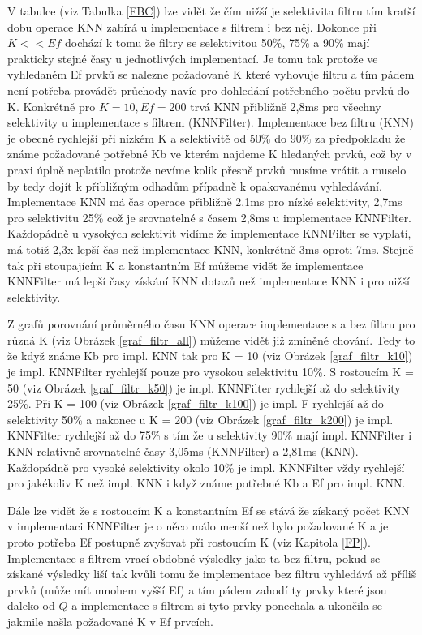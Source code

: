 \documentclass[czech,semestral,dept460,male,csharp,cpdeclaration]{diploma}
\begin{document}
		V tabulce (viz Tabulka \ref{FBC}) lze vidět že čím nižší je selektivita filtru tím kratší dobu operace KNN zabírá u implementace s filtrem i bez něj. Dokonce při $K << Ef$ dochází k tomu že filtry se selektivitou 50\%, 75\% a 90\% mají prakticky stejné časy u jednotlivých implementací. Je tomu tak protože ve vyhledaném Ef prvků se nalezne požadované K které vyhovuje filtru a tím pádem není potřeba provádět průchody navíc pro dohledání potřebného počtu prvků do K. Konkrétně pro $K = 10, Ef = 200$ trvá KNN přibližně 2,8ms pro všechny selektivity u implementace s filtrem (KNNFilter). Implementace bez filtru (KNN) je obecně rychlejší při nízkém K a selektivitě od 50\% do 90\% za předpokladu že známe požadované potřebné Kb ve kterém najdeme K hledaných prvků, což by v praxi úplně neplatilo protože nevíme kolik přesně prvků musíme vrátit a muselo by tedy dojít k přibližným odhadům případně k opakovanému vyhledávání. Implementace KNN má čas operace přibližně 2,1ms pro nízké selektivity, 2,7ms pro selektivitu 25\% což je srovnatelné s časem 2,8ms u implementace KNNFilter. Každopádně u vysokých selektivit vidíme že implementace KNNFilter se vyplatí, má totiž 2,3x lepší čas než implementace KNN, konkrétně 3ms oproti 7ms. Stejně tak při stoupajícím K a konstantním Ef můžeme vidět že implementace KNNFilter má lepší časy získání KNN dotazů než implementace KNN i pro nižší selektivity.
		
		Z grafů porovnání průměrného času KNN operace implementace s a bez filtru pro různá K (viz Obrázek \ref{graf_filtr_all}) můžeme vidět již zmíněné chování. Tedy to že když známe Kb pro impl. KNN tak pro K = 10 (viz Obrázek \ref{graf_filtr_k10}) je impl. KNNFilter rychlejší pouze pro vysokou selektivitu 10\%. S rostoucím K = 50 (viz Obrázek \ref{graf_filtr_k50}) je impl. KNNFilter rychlejší až do selektivity  25\%. Při K = 100 (viz Obrázek \ref{graf_filtr_k100}) je impl. F rychlejší až do selektivity 50\% a nakonec u K = 200 (viz Obrázek \ref{graf_filtr_k200}) je impl. KNNFilter rychlejší až do 75\% s tím že u selektivity 90\% mají impl. KNNFilter i KNN relativně srovnatelné časy 3,05ms (KNNFilter) a 2,81ms (KNN). Každopádně pro vysoké selektivity okolo 10\% je impl. KNNFilter vždy rychlejší pro jakékoliv K než impl. KNN i když známe potřebné Kb a Ef pro impl. KNN.
		
		Dále lze vidět že s rostoucím K a konstantním Ef se stává že získaný počet KNN v implementaci KNNFilter je o něco málo menší než bylo požadované K a je proto potřeba Ef postupně zvyšovat při rostoucím K (viz Kapitola \ref{FP}). Implementace s filtrem vrací obdobné výsledky jako ta bez filtru, pokud se získané výsledky liší tak kvůli tomu že implementace bez filtru vyhledává až příliš prvků (může mít mnohem vyšší Ef) a tím pádem zahodí ty prvky které jsou daleko od $Q$ a implementace s filtrem si tyto prvky ponechala a ukončila se jakmile našla požadované K v Ef prvcích.
		
\end{document}

